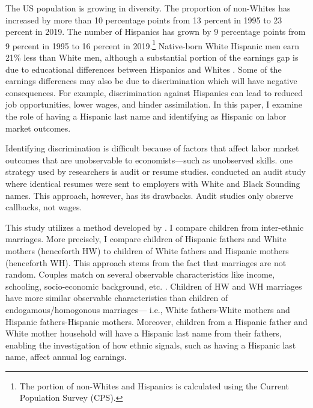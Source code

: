 \documentclass{wptemp}
\begin{document}
The US population is growing in diversity. The proportion of non-Whites has increased by more than 10 percentage points from 13 percent in 1995 to 23 percent in 2019. The number of Hispanics has grown by 9 percentage points from 9 percent in 1995 to 16 percent in 2019.\footnote{The portion of non-Whites and Hispanics is calculated using the Current Population Survey (CPS).} Native-born White Hispanic men earn 21\% less than White men, although a substantial portion of the earnings gap is due to educational differences between Hispanics and Whites \citep{duncan2006hispanics, duncan2018identifying, duncan2018socioeconomic}. Some of the earnings differences may also be due to discrimination which will have negative consequences. For example, discrimination against Hispanics can lead to reduced job opportunities, lower wages, and hinder assimilation. In this paper, I examine the role of having a Hispanic last name and identifying as Hispanic on labor market outcomes. 

Identifying discrimination is difficult because of factors that affect labor market outcomes that are unobservable to economists---such as unobserved skills. one strategy used by researchers is audit or resume studies. \citet{bertrand2004emily} conducted an audit study where identical resumes were sent to employers with White and Black Sounding names. This approach, however, has its drawbacks. Audit studies only observe callbacks, not wages. 

This study utilizes a method developed by \citet{rubinstein2014pride}. I compare children from inter-ethnic marriages. More precisely, I compare children of Hispanic fathers and White mothers (henceforth HW) to children of White fathers and Hispanic mothers (henceforth  WH). This approach stems from the fact that marriages are not random. Couples match on several observable characteristics like income, schooling, socio-economic background, etc. \citep{averettBetterWorseRelationship2008, averettEconomicRealityBeauty1996, beckerTheoryMarriagePart1973, beckerTheoryMarriagePart1974, beckerTreatiseFamily1993, browningCollectiveUnitaryModels2006, chiapporiFatterAttractionAnthropometric2012}. Children of HW and WH marriages have more similar observable characteristics than children of endogamous/homogonous marriages--- i.e., White fathers-White mothers and Hispanic fathers-Hispanic mothers. Moreover, children from a Hispanic father and White mother household will have a Hispanic last name from their fathers, enabling the investigation of how ethnic signals, such as having a Hispanic last name, affect annual log earnings.
\end{document}
